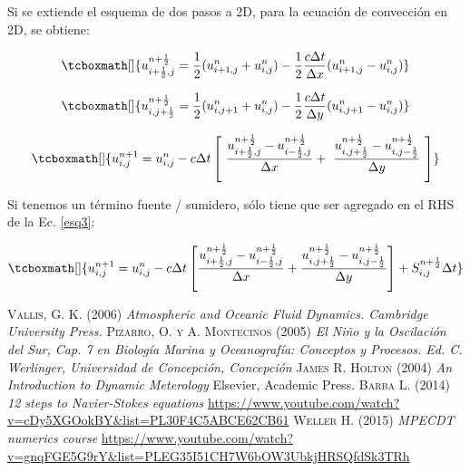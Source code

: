 \documentclass[12pt,dvipsnames]{exam}
\begin{document}
Si se extiende el esquema de dos pasos a 2D, para la ecuación de convección en 2D, se obtiene:

\begin{equation}
    \tcboxmath[]{u_{i+\frac{1}{2},j}^{n+\frac{1}{2}} = \dfrac{1}{2}(u_{i+1,j}^n+u_{i,j}^n)-\dfrac{1}{2}\dfrac{c\Delta t}{\Delta x}(u_{i+1,j}^n-u_{i,j}^n)}
\label{esq1}
\end{equation}

\begin{equation}
    \tcboxmath[]{u_{i,j+\frac{1}{2}}^{n+\frac{1}{2}} = \dfrac{1}{2}(u_{i,j+1}^n+u_{i,j}^n)-\dfrac{1}{2}\dfrac{c\Delta t}{\Delta y}(u_{i,j+1}^n-u_{i,j}^n)}
\label{esq2}
\end{equation}

\begin{equation}
    \tcboxmath[]{u_{i,j}^{n+1}=u_{i,j}^n-c \Delta t \left[  \dfrac{u_{i+\frac{1}{2},j}^{n+\frac{1}{2}}-u_{i-\frac{1}{2},j}^{n+\frac{1}{2}}}{\Delta x} +   \dfrac{u_{i,j+\frac{1}{2}}^{n+\frac{1}{2}}-u_{i,j-\frac{1}{2}}^{n+\frac{1}{2}}}{\Delta y}  \right]}
\label{esq3}
\end{equation}

Si tenemos un término fuente / sumidero, sólo tiene que ser agregado en el RHS de la Ec. \ref{esq3}:

\begin{equation}
\tcboxmath[]{u_{i,j}^{n+1}=u_{i,j}^n-c \Delta t \left[  \dfrac{u_{i+\frac{1}{2},j}^{n+\frac{1}{2}}-u_{i-\frac{1}{2},j}^{n+\frac{1}{2}}}{\Delta x} +   \dfrac{u_{i,j+\frac{1}{2}}^{n+\frac{1}{2}}-u_{i,j-\frac{1}{2}}^{n+\frac{1}{2}}}{\Delta y}  \right] + S_{i,j}^{n+\frac{1}{2}} \Delta t}
\label{esq4}
\end{equation}


\newpage
{}
{} 
\begin{thebibliography}{0}
     \textsc{Vallis, G. K.} (2006) \textit{Atmospheric and Oceanic Fluid Dynamics. Cambridge University Press.}
   \textsc{Pizarro, O. y A. Montecinos} (2005) \textit{El Niño y la Oscilación del Sur, Cap. 7 en Biología Marina y Oceanografía: Conceptos y Procesos. Ed. C. Werlinger, Universidad de Concepción, Concepción}
   \textsc{James R. Holton} (2004) \textit{An Introduction to Dynamic Meterology} Elsevier, Academic Press.
  \textsc{Barba L.} (2014) \textit{12 steps to Navier-Stokes equations} \url{https://www.youtube.com/watch?v=cDy5XGOokBY&list=PL30F4C5ABCE62CB61}
   \textsc{Weller H.} (2015) \textit{MPECDT numerics course} \url{https://www.youtube.com/watch?v=gnqFGE5G9rY&list=PLEG35I51CH7W6bOW3UbkjHRSQfdSk3TRh}
 
 
\end{thebibliography}
\end{document}
